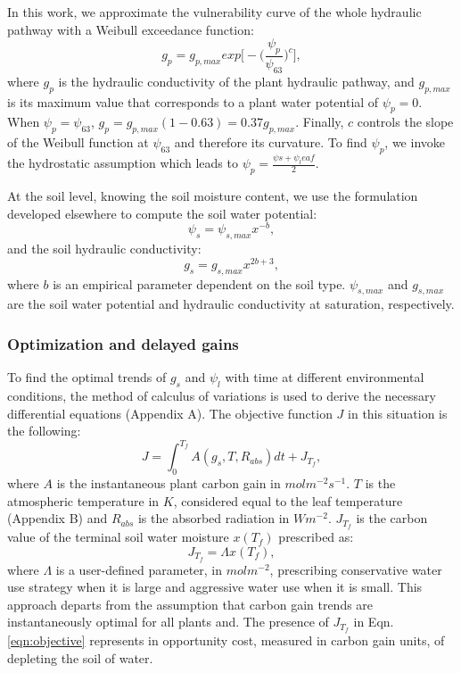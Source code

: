 \documentclass[utf8]{frontiersSCNS} %
\begin{document}
In this work, we approximate the vulnerability curve of the whole hydraulic pathway with a Weibull exceedance function:
\begin{equation}
    \label{eqn:Weibull}
    g_{p} = g_{p,max}exp\Big[-\Big(\frac{\psi_{p}}{\psi_{63}}\Big)^c\Big],
\end{equation}
where $g_{p}$ is the hydraulic conductivity of the plant hydraulic pathway, and $g_{p,max}$ is its maximum value that corresponds to a plant water potential of $\psi_{p}=0$. When $\psi_{p}=\psi_{63}$, $g_{p} = g_{p,max}(1-0.63) = 0.37g_{p,max}$. Finally, $c$ controls the slope of the Weibull function at $\psi_{63}$ and therefore its curvature. To find $\psi_{p}$, we invoke the hydrostatic assumption which leads to $\psi_{p}=\frac{\psi{s}+\psi_leaf}{2}$.

At the soil level, knowing the soil moisture content, we use the formulation developed elsewhere \citep{Clapp1978} to compute the soil water potential:
\begin{equation}
    \label{eqn:Clapp_psi}
    \psi_s = \psi_{s,max}x^{-b},
\end{equation}
and the soil hydraulic conductivity:
\begin{equation}
    \label{eqn:Clapp_cond}
    g_s = g_{s,max}x^{2b+3},
\end{equation}
where $b$ is an empirical parameter dependent on the soil type. $\psi_{s,max}$ and $g_{s,max}$ are the soil water potential and hydraulic conductivity at saturation, respectively.



\subsubsection{Optimization and delayed gains}

To find the optimal trends of $g_s$ and $\psi_l$ with time at different environmental conditions, the method of calculus of variations is used to derive the necessary differential equations (Appendix A). The objective function $J$ in this situation is the following:
\begin{equation}
    \label{eqn:objective}
    J = \int_0^{T_f} A(g_s,T,R_{abs}) dt + J_{T_f},
\end{equation}
where $A$ is the instantaneous plant carbon gain in $molm^{-2}s^{-1}$. $T$ is the atmospheric temperature in $K$, considered equal to the leaf temperature (Appendix B) and $R_{abs}$ is the absorbed radiation in $Wm^{-2}$. $J_{T_f}$ is the carbon value of the terminal soil water moisture $x(T_f)$ prescribed as:
\begin{equation}
    \label{eqn:terminal_gain}
    J_{T_f} = \Lambda x(T_f),
\end{equation}
where $\Lambda$ is a user-defined parameter, in $mol m^{-2}$, prescribing conservative water use strategy when it is large and aggressive water use when it is small. This approach departs from the assumption that carbon gain trends are instantaneously optimal for all plants and. The presence of $J_{T_f}$ in Eqn. \ref{eqn:objective} represents in opportunity cost, measured in carbon gain units, of depleting the soil of water.
\end{document}
